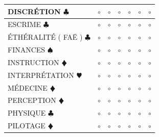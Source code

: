 \documentclass[a5paper,pagesize,french]{book}
\begin{document}
\begin{tabular}[c]{|p{}|p{}|p{}|p{}|p{}|p{}|p{}|}
	DISCRÉTION { $\clubsuit$ }							&	$\circ$	&	$\circ$	&	$\circ$	&	$\circ$	&	$\circ$		&	$\circ$		\\ \hline
	ESCRIME { $\clubsuit$ }								&	$\circ$	&	$\circ$	&	$\circ$	&	$\circ$	&	$\circ$		&	$\circ$		\\ \hline
	ÉTHÉRALITÉ ( FAË ) { $\clubsuit$ }					&	$\circ$	&	$\circ$	&	$\circ$	&	$\circ$	&	$\circ$		&	$\circ$		\\ \hline
	FINANCES { $\spadesuit$ }							&	$\circ$	&	$\circ$	&	$\circ$	&	$\circ$	&	$\circ$		&	$\circ$		\\ \hline
	INSTRUCTION {\color{red} $\vardiamond$ }			&	$\circ$	&	$\circ$	&	$\circ$	&	$\circ$	&	$\circ$		&	$\circ$		\\ \hline
	INTERPRÉTATION {\color{red} $\varheart$ }			&	$\circ$	&	$\circ$	&	$\circ$	&	$\circ$	&	$\circ$		&	$\circ$		\\ \hline
	MÉDECINE {\color{red} $\vardiamond$ }				&	$\circ$	&	$\circ$	&	$\circ$	&	$\circ$	&	$\circ$		&	$\circ$		\\ \hline
	PERCEPTION {\color{red} $\vardiamond$ }				&	$\circ$	&	$\circ$	&	$\circ$	&	$\circ$	&	$\circ$		&	$\circ$		\\ \hline
	PHYSIQUE { $\clubsuit$ }							&	$\circ$	&	$\circ$	&	$\circ$	&	$\circ$	&	$\circ$		&	$\circ$		\\ \hline
	PILOTAGE {\color{red} $\vardiamond$ }				&	$\circ$	&	$\circ$	&	$\circ$	&	$\circ$	&	$\circ$		&	$\circ$		\\ \hline

\end{tabular}
\end{document}
